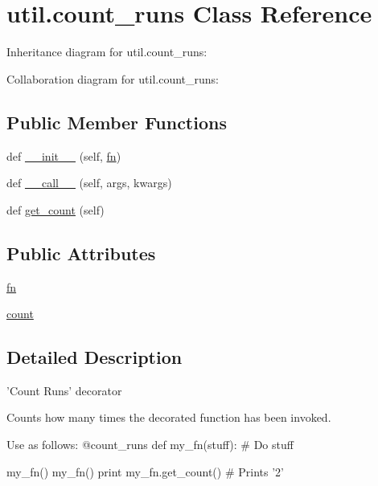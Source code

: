 \hypertarget{classutil_1_1count__runs}{}\section{util.\+count\+\_\+runs Class Reference}
\label{classutil_1_1count__runs}


Inheritance diagram for util.\+count\+\_\+runs\+:


Collaboration diagram for util.\+count\+\_\+runs\+:
\subsection*{Public Member Functions}
\begin{DoxyCompactItemize}
\item 
def \hyperlink{classutil_1_1count__runs_a5bf83d5b7f3a749eedccba76472f8b2d}{\+\_\+\+\_\+init\+\_\+\+\_\+} (self, \hyperlink{classutil_1_1count__runs_a1e912f55752dcca7405269868c429a1f}{fn})
\item 
def \hyperlink{classutil_1_1count__runs_ae82b54544fc78ad239f599b3bb4109e2}{\+\_\+\+\_\+call\+\_\+\+\_\+} (self, args, kwargs)
\item 
def \hyperlink{classutil_1_1count__runs_a0407743ed6b2fbdc242e08d0be3f1dce}{get\+\_\+count} (self)
\end{DoxyCompactItemize}
\subsection*{Public Attributes}
\begin{DoxyCompactItemize}
\item 
\hyperlink{classutil_1_1count__runs_a1e912f55752dcca7405269868c429a1f}{fn}
\item 
\hyperlink{classutil_1_1count__runs_a9f87d3221df46666f0ceb111a908e47a}{count}
\end{DoxyCompactItemize}


\subsection{Detailed Description}
\begin{DoxyVerb}'Count Runs' decorator

Counts how many times the decorated function has been invoked.

Use as follows:
@count_runs
def my_fn(stuff):
    # Do stuff


my_fn()
my_fn()
print my_fn.get_count()  # Prints '2'
\end{DoxyVerb}
 


